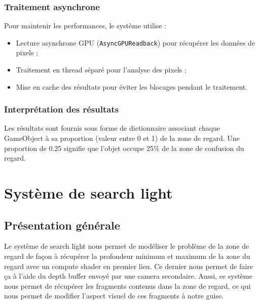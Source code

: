 \documentclass[12pt]{report}
\begin{document}
\subsection{Traitement asynchrone}
Pour maintenir les performances, le système utilise :
\begin{itemize}
    \vspace{2mm}
    \item Lecture asynchrone GPU (\texttt{AsyncGPUReadback}) pour récupérer les données de pixels ;
    \vspace{2mm}
    \item Traitement en thread séparé pour l'analyse des pixels ;
    \vspace{2mm}
    \item Mise en cache des résultats pour éviter les blocages pendant le traitement.
    \vspace{2mm}
\end{itemize}

\subsection{Interprétation des résultats}
Les résultats sont fournis sous forme de dictionnaire associant chaque GameObject à sa proportion (valeur entre 0 et 1) de la zone de regard. Une proportion de 0.25 signifie que l'objet occupe 25\% de la zone de confusion du regard.

\chapter{Système de search light}
\section{Présentation générale}
Le système de search light nous permet de modéliser le problème de la zone de regard de façon à récupérer la profondeur minimum et maximum de la zone du regard avec un compute shader en premier lieu. Ce dernier nous permet de faire ça à l'aide du depth buffer envoyé par une camera secondaire.
Aussi, ce système nous permet de récupérer les fragments contenus dans la zone de regard, ce qui nous permet de modifier l'aspect visuel de ces fragments à notre guise.
\end{document}
